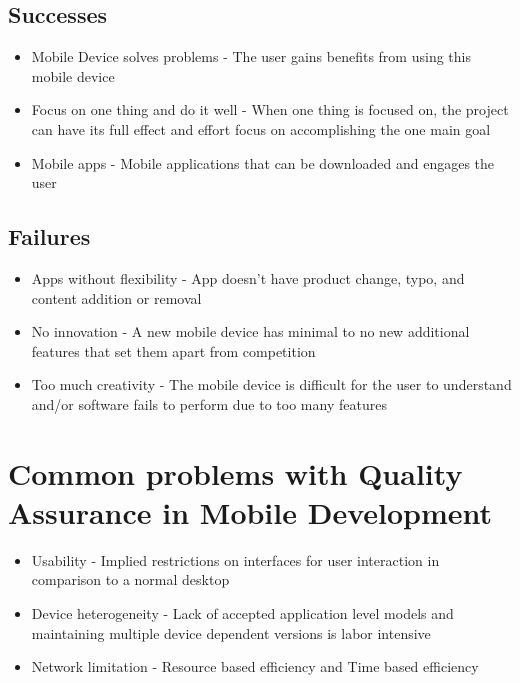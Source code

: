 \documentclass{article}
\begin{document}
		\subsection*{Successes}
			\begin{itemize}
				\item Mobile Device solves problems - The user gains benefits from using this mobile device
				\item Focus on one thing and do it well - When one thing is focused on, the project can have its full effect and effort focus on accomplishing the one main goal
				\item Mobile apps - Mobile applications that can be downloaded and engages the user
			\end{itemize}
		\subsection*{Failures}
			\begin{itemize}
				\item Apps without flexibility - App doesn't have product change, typo, and content addition or removal
				\item No innovation - A new mobile device has minimal to no new additional features that set them apart from competition
				\item Too much creativity - The mobile device is difficult for the user to understand and/or software fails to perform due to too many features
			\end{itemize}
	\section*{Common problems with Quality Assurance in Mobile Development}
		\begin{itemize}
			\item Usability - Implied restrictions on interfaces for user interaction in comparison to a normal desktop
			\item Device heterogeneity - Lack of accepted application level models and maintaining multiple device dependent versions is labor intensive
			\item Network limitation - Resource based efficiency and Time based efficiency
		\end{itemize}
\end{document}
